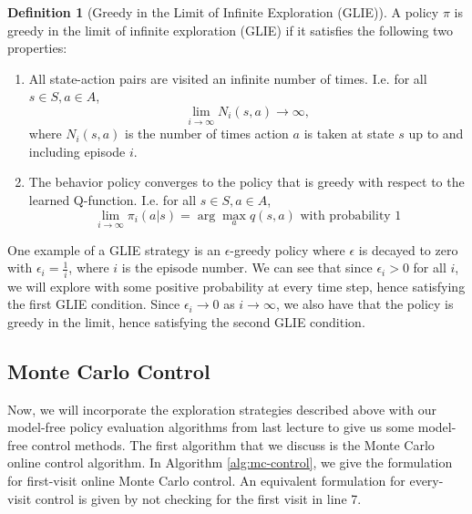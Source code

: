 \documentclass{article}
\theoremstyle{definition}
\newtheorem{definition}{Definition}[section]
\theoremstyle{remark}
\begin{document}
\begin{definition}[Greedy in the Limit of Infinite Exploration (GLIE)]
A policy $\pi$ is greedy in the limit of infinite exploration (GLIE) if it satisfies the following two properties:
\begin{enumerate}[noitemsep,partopsep=0pt,topsep=0pt,parsep=0pt]
	\item All state-action pairs are visited an infinite number of times.  I.e. for all $s \in S, a \in A$,
\begin{equation*}
\lim_{i\rightarrow\infty} N_i(s,a) \rightarrow \infty,
\end{equation*}
where $N_i(s,a)$ is the number of times action $a$ is taken at state $s$ up to and including episode $i$.
	\item The behavior policy converges to the policy that is greedy with respect to the learned Q-function.  I.e. for all $s \in S, a \in A$,
\begin{equation*}
\lim_{i\rightarrow\infty} \pi_i(a | s) = \arg\max_{a} q(s,a) \text{ with probability 1}
\end{equation*}
\end{enumerate}
\end{definition}

One example of a GLIE strategy is an $\epsilon$-greedy policy where $\epsilon$ is decayed to zero with $\epsilon_i = \frac{1}{i}$, where $i$ is the episode number.  We can see that since $\epsilon_i > 0$ for all $i$, we will explore with some positive probability at every time step, hence satisfying the first GLIE condition.  Since $\epsilon_i \rightarrow 0$ as $i \rightarrow \infty$, we also have that the policy is greedy in the limit, hence satisfying the second GLIE condition.

\subsection{Monte Carlo Control}
Now, we will incorporate the exploration strategies described above with our model-free policy evaluation algorithms from last lecture to give us some model-free control methods.  The first algorithm that we discuss is the Monte Carlo online control algorithm.  In Algorithm \ref{alg:mc-control}, we give the formulation for first-visit online Monte Carlo control.  An equivalent formulation for every-visit control is given by not checking for the first visit in line 7.
\end{document}
